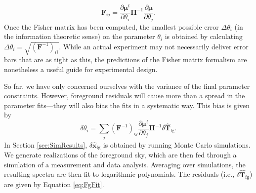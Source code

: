 \documentclass[twocolumn,apj,numberedappendix]{emulateapj}
\newcommand{\xhat}{\hat{\mathbf{x}}}
\newcommand{\F}{\mathbf{F}}
\begin{document}
\begin{equation}
\F_{ij} = \frac{\partial \boldsymbol \mu ^t}{\partial \theta_i} \boldsymbol \Pi ^{-1} \frac{\partial \boldsymbol \mu}{\partial \theta_j}.
\end{equation}
Once the Fisher matrix has been computed, the smallest possible error $\Delta \theta_i$ (in the information theoretic sense) on the parameter $\theta_i$ is obtained by calculating $\Delta \theta_i = \sqrt{(\F^{-1})_{ii}}$. While an actual experiment may not necessarily deliver error bars that are as tight as this, the predictions of the Fisher matrix formalism are nonetheless a useful guide for experimental design.

So far, we have only concerned ourselves with the variance of the final parameter constraints. However, foreground residuals will cause more than a spread in the parameter fits---they will also bias the fits in a systematic way. This bias is given by
\begin{equation}
\delta \theta_i = \sum_{j} (\F^{-1})_{ij} \frac{\partial \boldsymbol \mu ^t}{\partial \theta_j} \boldsymbol \Pi ^{-1} \delta \widehat{\mathbf{T}}_\textrm{fg}.
\end{equation}
In Section \ref{sec:SimResults}, $\delta \xhat_\textrm{fg}$ is obtained by running Monte Carlo simulations. We generate realizations of the foreground sky, which are then fed through a simulation of a measurement and data analysis. Averaging over simulations, the resulting spectra are then fit to logarithmic polynomials. The residuals (i.e., $\delta \widehat{\mathbf{T}}_\textrm{fg}$) are given by Equation \eqref{eq:FgFit}.
\end{document}

